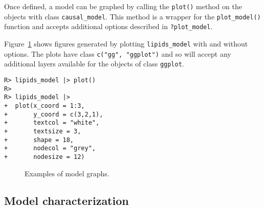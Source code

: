 \documentclass[
  11pt,
  article]{jss}
\begin{document}
Once defined, a model can be graphed by calling the \texttt{plot()}
method on the objects with class \texttt{causal\_model}. This method is
a wrapper for the \texttt{plot\_model()} function and accepts additional
options described in \texttt{?plot\_model}.

Figure~\ref{fig-plots} shows figures generated by plotting
\texttt{lipids\_model} with and without options. The plots have class
\texttt{c("gg",\ "ggplot")} and so will accept any additional layers
available for the objects of class \texttt{ggplot}.

\begin{verbatim}
R> lipids_model |> plot()
R> 
R> lipids_model |>
+  plot(x_coord = 1:3,
+       y_coord = c(3,2,1),
+       textcol = "white",
+       textsize = 3,
+       shape = 18,
+       nodecol = "grey",
+       nodesize = 12)
\end{verbatim}

\begin{figure}

\begin{minipage}[t]{0.50\linewidth}

{\centering 


}

\end{minipage}%
%
\begin{minipage}[t]{0.50\linewidth}

{\centering 


}

\end{minipage}%

\caption{\label{fig-plots}Examples of model graphs.}

\end{figure}

\hypertarget{model-characterization}{%
\subsection{Model characterization}\label{model-characterization}}
\end{document}

